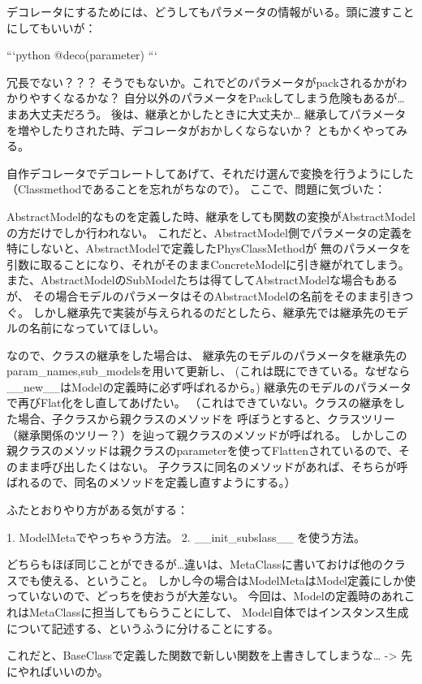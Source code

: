 \begin{DoxyVerb} デコレータにするためには、どうしてもパラメータの情報がいる。頭に渡すことにしてもいいが：

 ```python
 @deco(parameter)
 ```

 冗長でない？？？
 そうでもないか。これでどのパラメータがpackされるかがわかりやすくなるかな？
 自分以外のパラメータをPackしてしまう危険もあるが…まあ大丈夫だろう。
 後は、継承とかしたときに大丈夫か…
 継承してパラメータを増やしたりされた時、デコレータがおかしくならないか？
 ともかくやってみる。


 自作デコレータでデコレートしてあげて、それだけ選んで変換を行うようにした（Classmethodであることを忘れがちなので）。
 ここで、問題に気づいた：

 AbstractModel的なものを定義した時、継承をしても関数の変換がAbstractModelの方だけでしか行われない。
 これだと、AbstractModel側でパラメータの定義を特にしないと、AbstractModelで定義したPhysClassMethodが
 無のパラメータを引数に取ることになり、それがそのままConcreteModelに引き継がれてしまう。
 また、AbstractModelのSubModelたちは得てしてAbstractModelな場合もあるが、
 その場合モデルのパラメータはそのAbstractModelの名前をそのまま引きつぐ。
 しかし継承先で実装が与えられるのだとしたら、継承先では継承先のモデルの名前になっていてほしい。

 なので、クラスの継承をした場合は、
 継承先のモデルのパラメータを継承先のparam_names,sub_modelsを用いて更新し、
 (これは既にできている。なぜなら__new__はModelの定義時に必ず呼ばれるから。)
 継承先のモデルのパラメータで再びFlat化をし直してあげたい。
 （これはできていない。クラスの継承をした場合、子クラスから親クラスのメソッドを
 呼ぼうとすると、クラスツリー（継承関係のツリー？）を辿って親クラスのメソッドが呼ばれる。
 しかしこの親クラスのメソッドは親クラスのparameterを使ってFlattenされているので、そのまま呼び出したくはない。
 子クラスに同名のメソッドがあれば、そちらが呼ばれるので、同名のメソッドを定義し直すようにする。）

 ふたとおりやり方がある気がする：

 1. ModelMetaでやっちゃう方法。
 2. __init_subslass__ を使う方法。

 どちらもほぼ同じことができるが…違いは、MetaClassに書いておけば他のクラスでも使える、ということ。
 しかし今の場合はModelMetaはModel定義にしか使っていないので、どっちを使おうが大差ない。
 今回は、Modelの定義時のあれこれはMetaClassに担当してもらうことにして、
 Model自体ではインスタンス生成について記述する、というふうに分けることにする。

 これだと、BaseClassで定義した関数で新しい関数を上書きしてしまうな…
 -> 先にやればいいのか。


\end{DoxyVerb}
